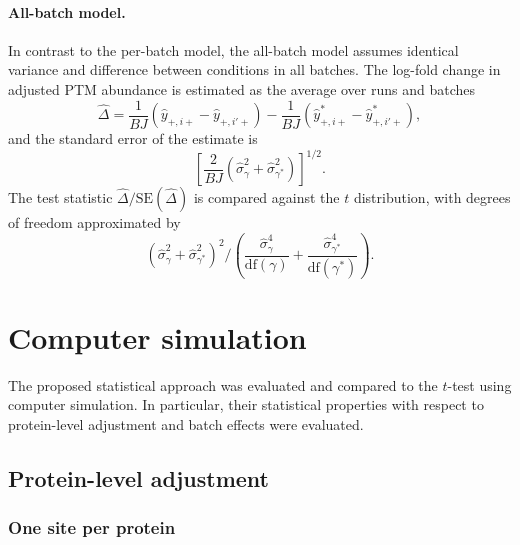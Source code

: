 \documentclass{mcp}
\begin{document}
\paragraph{All-batch model.}
In contrast to the per-batch model, the all-batch model assumes identical variance and difference between conditions in all batches. The log-fold change in adjusted PTM abundance is estimated as the average over runs and batches
\[
\hat{\Delta} = \frac{1}{BJ} \left( \hat{y}_{+,i+} - \hat{y}_{+,i'+} \right) - \frac{1}{BJ} \left( \hat{y}_{+,i+}^{\ast} - \hat{y}_{+,i'+}^{\ast} \right),
\]
and the standard error of the estimate is 
\[
\left[ \frac{2}{BJ} \left( \hat{\sigma}_{\gamma}^{2} + \hat{\sigma}_{\gamma^{\ast}}^{2} \right) \right] ^{1/2}.
\]
The test statistic $\hat{\Delta} / \mathrm{SE}(\hat{\Delta})$ is compared against the $t$ distribution, with degrees of freedom approximated by
\[
\left( \hat{\sigma}_{\gamma}^{2} + \hat{\sigma}_{\gamma^{\ast}}^{2} \right)^2 \bigg/
\left( \frac{\hat{\sigma}_{\gamma}^{4}}{  \mathrm{df}(\gamma)} + \frac{\hat{\sigma}_{\gamma^{\ast}}^{4}}{\mathrm{df}(\gamma^{\ast})} \right).
\]


\section{Computer simulation}
\label{sec:sim}

The proposed statistical approach was evaluated and compared to the $t$-test using computer simulation. In particular, their statistical properties with respect to protein-level adjustment and batch effects were evaluated. 


\subsection{Protein-level adjustment}


\subsubsection{One site per protein}
\end{document}
